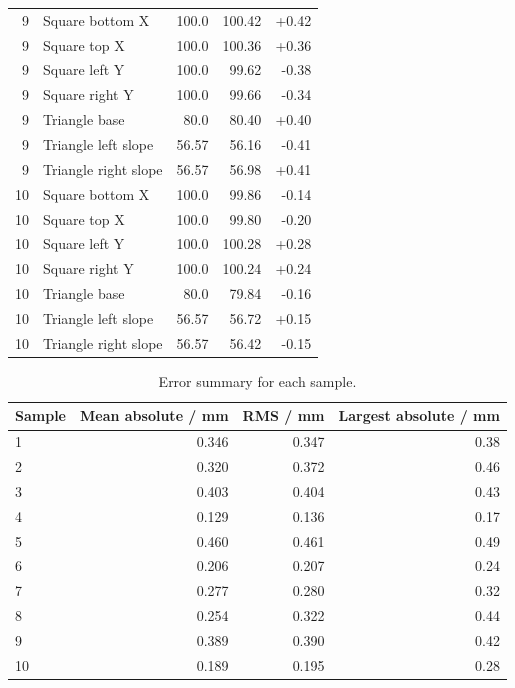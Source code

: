 \begin{longtable}{rlrrr}
9 & Square bottom X & 100.0 & 100.42 & +0.42\\
9 & Square top X & 100.0 & 100.36 & +0.36\\
9 & Square left Y & 100.0 & 99.62 & -0.38\\
9 & Square right Y & 100.0 & 99.66 & -0.34\\
9 & Triangle base & 80.0 & 80.40 & +0.40\\
9 & Triangle left slope & 56.57 & 56.16 & -0.41\\
9 & Triangle right slope & 56.57 & 56.98 & +0.41\\
10 & Square bottom X & 100.0 & 99.86 & -0.14\\
10 & Square top X & 100.0 & 99.80 & -0.20\\
10 & Square left Y & 100.0 & 100.28 & +0.28\\
10 & Square right Y & 100.0 & 100.24 & +0.24\\
10 & Triangle base & 80.0 & 79.84 & -0.16\\
10 & Triangle left slope & 56.57 & 56.72 & +0.15\\
10 & Triangle right slope & 56.57 & 56.42 & -0.15\\
\bottomrule\end{longtable}
\begin{table}[H]\centering\small
\begin{tabular}{lrrr}
\toprule Sample & Mean absolute / mm & RMS / mm & Largest absolute / mm\\\midrule
1 & 0.346 & 0.347 & 0.38\\
2 & 0.320 & 0.372 & 0.46\\
3 & 0.403 & 0.404 & 0.43\\
4 & 0.129 & 0.136 & 0.17\\
5 & 0.460 & 0.461 & 0.49\\
6 & 0.206 & 0.207 & 0.24\\
7 & 0.277 & 0.280 & 0.32\\
8 & 0.254 & 0.322 & 0.44\\
9 & 0.389 & 0.390 & 0.42\\
10 & 0.189 & 0.195 & 0.28\\
\bottomrule\end{tabular}
\caption{Error summary for each sample.}\label{tab:app-gantry-samples}\end{table}
